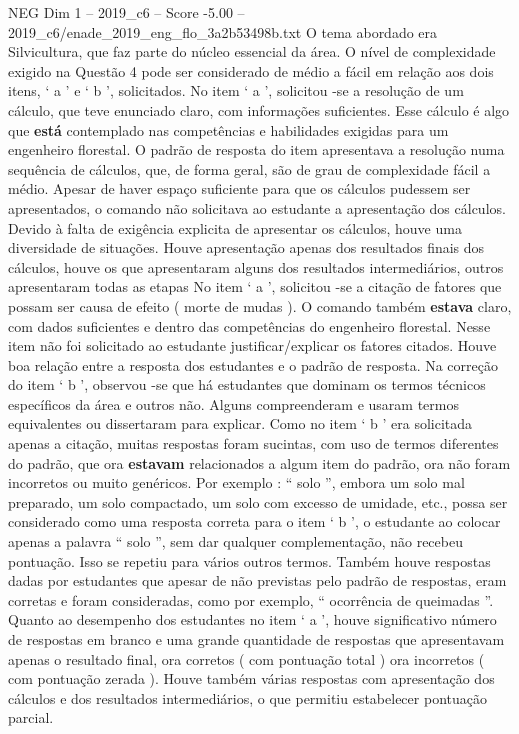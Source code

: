 \begin{textsample}{NEG Dim 1 – 2019\_c6 – Score -5.00 – 2019\_c6/enade\_2019\_eng\_flo\_3a2b53498b.txt}
O tema abordado era Silvicultura, que faz parte do núcleo essencial da área.
O nível de complexidade exigido na Questão 4 pode ser considerado de médio a fácil em relação aos dois itens, ‘ a ’ e ‘ b ’, solicitados.
No item ‘ a ’, solicitou -se a resolução de um cálculo, que teve enunciado claro, com informações suficientes.
Esse cálculo é algo que \textbf{está} contemplado nas competências e habilidades exigidas para um engenheiro florestal.
O padrão de resposta do item apresentava a resolução numa sequência de cálculos, que, de forma geral, são de grau de complexidade fácil a médio.
Apesar de haver espaço suficiente para que os cálculos pudessem ser apresentados, o comando não solicitava ao estudante a apresentação dos cálculos.
Devido à falta de exigência explicita de apresentar os cálculos, houve uma diversidade de situações.
Houve apresentação apenas dos resultados finais dos cálculos, houve os que apresentaram alguns dos resultados intermediários, outros apresentaram todas as etapas No item ‘ a ’, solicitou -se a citação de fatores que possam ser causa de efeito ( morte de mudas ).
O comando também \textbf{estava} claro, com dados suficientes e dentro das competências do engenheiro florestal.
Nesse item não foi solicitado ao estudante justificar/explicar os fatores citados.
Houve boa relação entre a resposta dos estudantes e o padrão de resposta.
Na correção do item ‘ b ’, observou -se que há estudantes que dominam os termos técnicos específicos da área e outros não.
Alguns compreenderam e usaram termos equivalentes ou dissertaram para explicar.
Como no item ‘ b ’ era solicitada apenas a citação, muitas respostas foram sucintas, com uso de termos diferentes do padrão, que ora \textbf{estavam} relacionados a algum item do padrão, ora não foram incorretos ou muito genéricos.
Por exemplo : “ solo ”, embora um solo mal preparado, um solo compactado, um solo com excesso de umidade, etc., possa ser considerado como uma resposta correta para o item ‘ b ’, o estudante ao colocar apenas a palavra “ solo ”, sem dar qualquer complementação, não recebeu pontuação.
Isso se repetiu para vários outros termos.
Também houve respostas dadas por estudantes que apesar de não previstas pelo padrão de respostas, eram corretas e foram consideradas, como por exemplo, “ ocorrência de queimadas ”.
Quanto ao desempenho dos estudantes no item ‘ a ’, houve significativo número de respostas em branco e uma grande quantidade de respostas que apresentavam apenas o resultado final, ora corretos ( com pontuação total ) ora incorretos ( com pontuação zerada ).
Houve também várias respostas com apresentação dos cálculos e dos resultados intermediários, o que permitiu estabelecer pontuação parcial.

\end{textsample}
